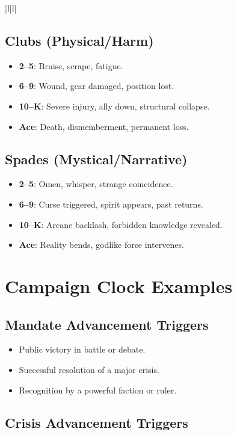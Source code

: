 \begin{itemular}{|l|l|}
\subsection*{Clubs (Physical/Harm)}

\begin{itemize}
    \item \textbf{2–5}: Bruise, scrape, fatigue.
    \item \textbf{6–9}: Wound, gear damaged, position lost.
    \item \textbf{10–K}: Severe injury, ally down, structural collapse.
    \item \textbf{Ace}: Death, dismemberment, permanent loss.
\end{itemize}

\subsection*{Spades (Mystical/Narrative)}

\begin{itemize}
    \item \textbf{2–5}: Omen, whisper, strange coincidence.
    \item \textbf{6–9}: Curse triggered, spirit appears, past returns.
    \item \textbf{10–K}: Arcane backlash, forbidden knowledge revealed.
    \item \textbf{Ace}: Reality bends, godlike force intervenes.
\end{itemize}

\section*{Campaign Clock Examples}

\subsection*{Mandate Advancement Triggers}

\begin{itemize}
    \item Public victory in battle or debate.
    \item Successful resolution of a major crisis.
    \item Recognition by a powerful faction or ruler.
\end{itemize}

\subsection*{Crisis Advancement Triggers}


\end{itemular}
